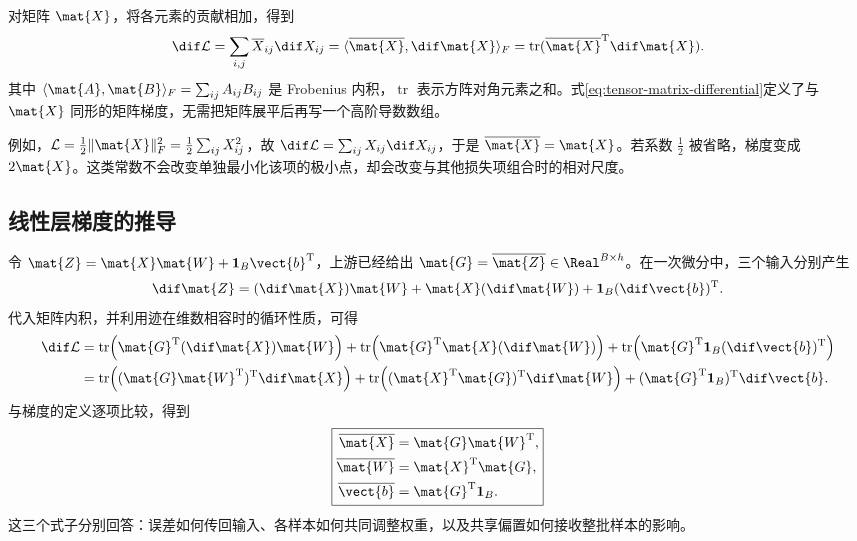 \documentclass[../textbook.tex]{subfiles}
\begin{document}
对矩阵 $\mat{X}$，将各元素的贡献相加，得到
\begin{equation}
 \dif\mathcal L=\sum_{i,j}\overline X_{ij}\dif X_{ij}
 =\langle\overline{\mat{X}},\dif \mat{X}\rangle_F
 =\operatorname{tr}(\overline{\mat{X}}^{\mathrm{T}}\dif \mat{X}).
 \label{eq:tensor-matrix-differential}
\end{equation}
其中 $\langle \mat{A},\mat{B}\rangle_F=\sum_{ij}A_{ij}B_{ij}$ 是 Frobenius 内积，$\operatorname{tr}$ 表示方阵对角元素之和。式\eqref{eq:tensor-matrix-differential}定义了与 $\mat{X}$ 同形的矩阵梯度，无需把矩阵展平后再写一个高阶导数数组。

例如，$\mathcal L=\frac12\|\mat{X}\|_F^2=\frac12\sum_{ij}X_{ij}^2$，故
$\dif\mathcal L=\sum_{ij}X_{ij}\dif X_{ij}$，于是 $\overline{\mat{X}}=\mat{X}$。若系数 $\frac{1}{2}$ 被省略，梯度变成 $2\mat{X}$。这类常数不会改变单独最小化该项的极小点，却会改变与其他损失项组合时的相对尺度。

\subsection{线性层梯度的推导}
令 $\mat{Z}=\mat{X}\mat{W}+\mathbf1_B\vect{b}^{\mathrm{T}}$，上游已经给出 $\mat{G}=\overline{\mat{Z}}\in\Real^{B\times h}$。在一次微分中，三个输入分别产生
\begin{equation}
 \dif \mat{Z}=(\dif \mat{X})\mat{W}+\mat{X}(\dif \mat{W})+\mathbf1_B(\dif \vect{b})^{\mathrm{T}}.
\end{equation}
代入矩阵内积，并利用迹在维数相容时的循环性质，可得
\begin{align}
 \dif\mathcal L
 &=\operatorname{tr}\!\left(\mat{G}^{\mathrm{T}}(\dif \mat{X})\mat{W}\right)
  +\operatorname{tr}\!\left(\mat{G}^{\mathrm{T}}\mat{X}(\dif \mat{W})\right)
  +\operatorname{tr}\!\left(\mat{G}^{\mathrm{T}}\mathbf1_B(\dif \vect{b})^{\mathrm{T}}\right)\\
 &=\operatorname{tr}\!\left((\mat{G}\mat{W}^{\mathrm{T}})^{\mathrm{T}}\dif \mat{X}\right)
  +\operatorname{tr}\!\left((\mat{X}^{\mathrm{T}}\mat{G})^{\mathrm{T}}\dif \mat{W}\right)
  +(\mat{G}^{\mathrm{T}}\mathbf1_B)^{\mathrm{T}}\dif \vect{b}.
\end{align}
与梯度的定义逐项比较，得到
\begin{equation}\label{eq:tensor-linear-backward}
 \boxed{
 \begin{aligned}
  \overline{\mat{X}} &= \mat{G}\mat{W}^{\mathrm{T}}, \\
  \overline{\mat{W}} &= \mat{X}^{\mathrm{T}}\mat{G}, \\
  \overline{\vect{b}} &= \mat{G}^{\mathrm{T}}\mathbf1_B.
 \end{aligned}
 }
\end{equation}
这三个式子分别回答：误差如何传回输入、各样本如何共同调整权重，以及共享偏置如何接收整批样本的影响。
\end{document}
